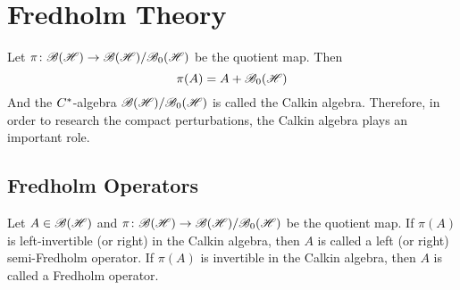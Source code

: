 \documentclass[a4paper,11pt]{report}
\begin{document}
\section{Fredholm Theory}

Let $\pi \colon \mathscr{B(H)} \rightarrow \mathscr{B(H)} / \mathscr{B}_{0}\mathscr{(H)}$ be the quotient map. Then 
\begin{equation*}
	\pi(A) = A + \mathscr{B}_{0}\mathscr{(H)}
\end{equation*}
And the $C^{*}$-algebra $\mathscr{B(H)} / \mathscr{B}_{0}\mathscr{(H)}$ is called the Calkin algebra. Therefore, in order to research the compact perturbations, the Calkin algebra plays an important role. 

\subsection{Fredholm Operators}

\begin{defn}
	Let $A \in \mathscr{B(H)}$ and $\pi \colon \mathscr{B(H)} \rightarrow \mathscr{B(H)} / \mathscr{B}_{0}\mathscr{(H)}$ be the quotient map. If $\pi(A)$ is left-invertible (or right) in the Calkin algebra, then $A$ is called a left (or right) semi-Fredholm operator. If $\pi(A)$ is invertible in the Calkin algebra, then $A$ is called a Fredholm operator.
\end{defn}
\end{document}
